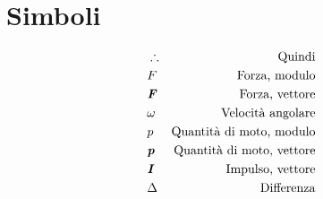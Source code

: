 \section{Simboli}

\begin{align*}
    &\therefore  & \text{Quindi}\\
    &F           & \text{Forza, modulo}\\
    &\textbf{\textit{F}} & \text{Forza, vettore}\\
    &\omega      & \text{Velocità angolare}\\
    &p           & \text{Quantità di moto, modulo}\\
    &\textbf{\textit{p}} & \text{Quantità di moto, vettore}\\
    &\textbf{\textit{I}} & \text{Impulso, vettore}\\
    &\Delta      & \text{Differenza}
\end{align*}
